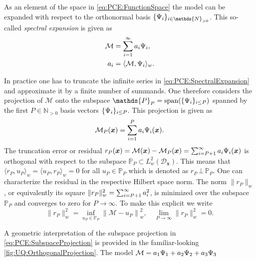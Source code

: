 As an element of the space in \cref{eq:PCE:FunctionSpace} the model can be expanded with respect to the orthonormal basis \(\{\basis_{i}\}_{i \in \mathds{N}_{>0}}\).
This so-called \emph{spectral expansion} is given as
\begin{align}
  \mathcal{M} &= \sum\limits_{i=1}^\infty a_{i} \Psi_{i}, \label{eq:PCE:SpectralExpansion} \\
  a_{i} &= \langle \mathcal{M}, \Psi_{i} \rangle_w. \label{eq:PCE:SpectralProjection}
\end{align}
\par %
In practice one has to truncate the infinite series in \cref{eq:PCE:SpectralExpansion} and approximate it by a finite number of summands.
One therefore considers the projection of \(\mathcal{M}\) onto the subspace
\(\mathds{P}_P = \mathrm{span}(\{\basis_{i}\}_{i \leq P})\) spanned by the first \(P \in \mathds{N}_{>0}\) basis vectors \(\{\Psi_{i}\}_{i \leq P}\).
This projection is given as
\begin{equation} \label{eq:PCE:SubspaceProjection}
  \mathcal{M}_P(\bm{x}) = \sum\limits_{i=1}^P a_{i} \Psi_{i}(\bm{x}).
\end{equation}
The truncation error or residual \(r_P(\bm{x}) = \mathcal{M}(\bm{x}) - \mathcal{M}_P(\bm{x}) = \sum_{i=P+1}^\infty a_{i} \Psi_{i}(\bm{x})\)
is orthogonal with respect to the subspace \(\mathds{P}_P \subset L_{w}^2(\mathcal{D}_{\bm{x}})\).
This means that \(\langle r_P, u_P \rangle_w = \langle u_P, r_P \rangle_w = 0\) for all \(u_P \in \mathds{P}_P\) which is denoted as \(r_P \, \bot \, \mathds{P}_P\).
One can characterize the residual in the respective Hilbert space norm.
The norm \(\lVert r_P \rVert_w\), or equivalently its square \(\lVert r_P \rVert_w^2 = \sum_{i=P+1}^\infty a_{i}^2\),
is minimized over the subspace \(\mathds{P}_P\) and converges to zero for \(P \to \infty\).
To make this explicit we write
\begin{equation} \label{eq:PCE:Optimality}
  \lVert r_P \rVert_w^2 = \operatorname*{inf}_{u_P \in \mathds{P}_P} \left\lVert \mathcal{M}-u_P \right\rVert_w^2, \quad
  \lim\limits_{P \to \infty} \lVert r_P \rVert_w^2 = 0.
\end{equation}
\par %
A geometric interpretation of the subspace projection in \cref{eq:PCE:SubspaceProjection} is provided in the familiar-looking \cref{fig:UQ:OrthogonalProjection}.
The model \(\mathcal{M} =  a_1 \Psi_1 + a_2 \Psi_2 + a_3 \Psi_3\)
